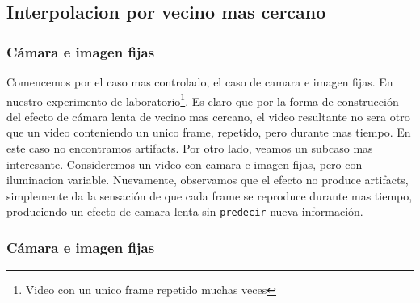 \subsection{Interpolacion por vecino mas cercano}
\subsubsection{Cámara e imagen fijas}
Comencemos por el caso mas controlado, el caso de camara e imagen fijas. En nuestro experimento de laboratorio\footnote{Video con un unico frame repetido muchas veces}. Es claro que por la forma de construcción del efecto de cámara lenta de vecino mas cercano, el video resultante no sera otro que un video conteniendo un unico frame, repetido, pero durante mas tiempo. En este caso no encontramos artifacts. Por otro lado, veamos un subcaso mas interesante. Consideremos un video con camara e imagen fijas, pero con iluminacion variable. Nuevamente, observamos que el efecto no produce artifacts, 
simplemente da la sensación de que cada frame se reproduce durante mas tiempo, produciendo un efecto de camara lenta sin \texttt{predecir} nueva información.

\subsubsection{Cámara e imagen fijas}
